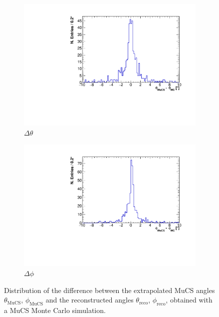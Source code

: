 \documentclass[a4paper]{scrartcl}
\begin{document}
\begin{figure}[htbp]
  \begin{subfigure}{0.5\textwidth}
    \includegraphics[width=\linewidth]{figures/theta_res.pdf}
    \caption{$\Delta\theta$}
  \end{subfigure}
  \begin{subfigure}{0.5\textwidth}
    \includegraphics[width=\linewidth]{figures/phi_res.pdf}
    \caption{$\Delta\phi$}
  \end{subfigure}
\caption{Distribution of the difference between the extrapolated MuCS angles $\theta_{\mathrm{MuCS}}$, $\phi_{\mathrm{MuCS}}$ and the reconstructed angles $\theta_{\mathrm{reco}}$, $\phi_{\mathrm{reco}}$, obtained with a MuCS Monte Carlo simulation.}\label{fig:res}
\end{figure}
\end{document}

